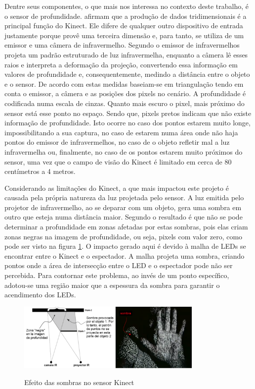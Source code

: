 Dentre seus componentes, o que mais nos interessa no contexto deste trabalho, é o sensor de profundidade.  afirmam que a produção de dados tridimensionais é a principal função do Kinect. Ele difere de qualquer outro dispositivo de entrada justamente porque provê uma terceira dimensão e, para tanto, se utiliza de um emissor e uma câmera de infravermelho. Segundo  o emissor de infravermelhos projeta um padrão estruturado de luz infravermelha, enquanto a câmera lê esses raios e interpreta a deformação da projeção, convertendo essa informação em valores de profundidade e, consequentemente, medindo a distância entre o objeto e o sensor. De acordo com  estas medidas baseiam-se em triangulação tendo em conta o emissor, a câmera e as posições dos pixels no cenário. A profundidade é codificada numa escala de cinzas. Quanto mais escuro o pixel, mais próximo do sensor está esse ponto no espaço. Sendo que, pixels pretos indicam que não existe informação de profundidade. Isto ocorre no caso dos pontos estarem muito longe, impossibilitando a sua captura, no caso de estarem numa área onde não haja pontos do emissor de infravermelhos, no caso de o objeto refletir mal a luz infravermelha ou, finalmente, no caso de os pontos estarem muito próximos do sensor, uma vez que o campo de visão do Kinect é limitado em cerca de 80 centímetros a 4 metros.

Considerando as limitações do Kinect, a que mais impactou este projeto é causada pela própria natureza da luz projetada pelo sensor. A luz emitida pelo projetor de infravermelho, ao se deparar com um objeto, gera uma sombra em outro que esteja numa distância maior. Segundo  o resultado é que não se pode determinar a profundidade em zonas afetadas por estas sombras, pois elas criam zonas negras na imagem de profundidade, ou seja, pixels com valor zero, como pode ser visto na figura \ref{fig:kinect_sombras}. O impacto gerado aqui é devido à malha de LEDs se encontrar entre o Kinect e o espectador. A malha projeta uma sombra, criando pontos onde a área de intersecção entre o LED e o espectador pode não ser percebida. Para contornar este problema, ao invés de um ponto específico, adotou-se uma região maior que a espessura da sombra para garantir o acendimento dos LEDs.

\begin{figure}[H]
    \centering
    \caption{Efeito das sombras no sensor Kinect}
	\vspace*{0,2cm}
    \includegraphics[width=0.8\textwidth]{./04-figuras/kinect_sombras}
    \label{fig:kinect_sombras}
\end{figure}
\vspace*{-0,9cm}
{\raggedright {}}\\

